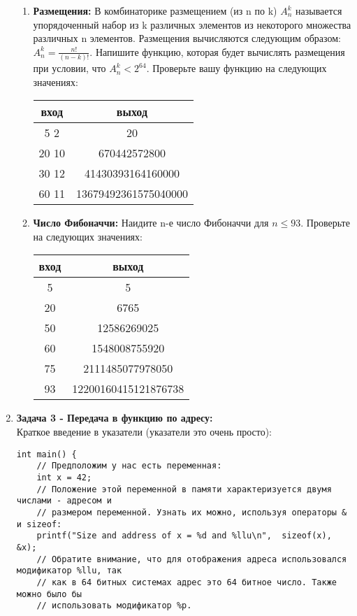 \documentclass{article}
\begin{document}
\begin{enumerate}
\begin{enumerate}
\item \textbf{Размещения:} В комбинаторике размещением (из n по k) $A_n^k$ называется упорядоченный набор из k различных элементов из некоторого множества различных n элементов. Размещения вычисляются следующим образом: $A_n^k = \frac{n!}{(n-k)!}$. Напишите функцию, которая будет вычислять размещения при условии, что  $A_n^k < 2^{64}$. Проверьте вашу функцию на следующих значениях:
\begin{center}
\begin{tabular}{ c c }
 вход & выход \\ \hline
 5 2 & 20  \\ 
 20 10 & 670442572800  \\ 
 30 12 & 41430393164160000 \\ 
 60 11 & 13679492361575040000 \\   
\end{tabular}
\end{center}
\item \textbf{Число Фибоначчи:} Наидите n-е число Фибоначчи для $n \leq 93$. Проверьте на следующих значениях:
\begin{center}
\begin{tabular}{ c c }
 вход & выход \\ \hline
 5 & 5  \\ 
 20 & 6765 \\ 
 50 & 12586269025 \\ 
 60 & 1548008755920 \\ 
 75 & 2111485077978050 \\
 93 & 12200160415121876738 \\   
\end{tabular}
\end{center}
\end{enumerate}



\newpage
\item \textbf{Задача 3 - Передача в функцию по адресу:} \\
Краткое введение в указатели (указатели это очень просто):
\begin{lstlisting}
int main() { 
    // Предположим у нас есть переменная:
    int x = 42; 
    // Положение этой переменной в памяти характеризуется двумя числами - адресом и 
    // размером переменной. Узнать их можно, используя операторы & и sizeof:
    printf("Size and address of x = %d and %llu\n",  sizeof(x), &x);
    // Обратите внимание, что для отображения адреса использовался модификатор %llu, так 
    // как в 64 битных системах адрес это 64 битное число. Также можно было бы 
    // использовать модификатор %p.
    

\end{lstlisting}
\end{enumerate}
\end{document}
